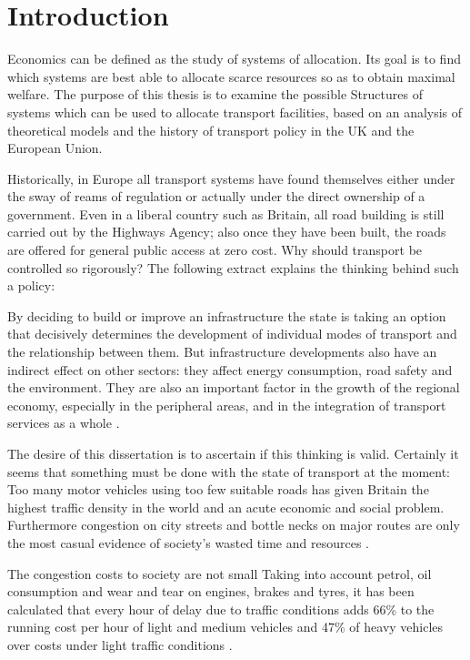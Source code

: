 \chapter{Introduction}

Economics can be defined as the study of systems of allocation. Its goal is to find which systems are best able to allocate scarce resources so as to obtain maximal welfare. The purpose of this thesis is to examine the possible Structures of systems which can be used to allocate transport facilities, based on an analysis of theoretical models and the history of transport policy in the UK and the European Union.

Historically, in Europe all transport systems have found themselves either under the sway of reams of regulation or actually under the direct ownership of a government. Even in a liberal country such as Britain, all road building is still carried out by the Highways Agency; also once they have been built, the roads are offered for general public access at zero cost. Why should transport be controlled so rigorously? The following extract explains the thinking behind such a policy:

\begin{displayquote}
By deciding to build or improve an infrastructure the state is taking an option that decisively determines the development of individual modes of transport and the relationship between them. But infrastructure developments also have an indirect effect on other sectors: they affect energy consumption, road safety and the environment. They are also an important factor in the growth of the regional economy, especially in the peripheral areas, and in the integration of transport services as a whole \cite{Stasinopoulos:1995}.
\end{displayquote}

The desire of this dissertation is to ascertain if this thinking is valid. Certainly it seems that something must be done with the state of transport at the moment: Too many motor vehicles using too few suitable roads has given Britain the highest traffic density in the world and an acute economic and social problem. Furthermore congestion on city streets and bottle necks on major routes are only the most casual evidence of society's wasted time and resources \cite{Rodgers:1959}.
 
The congestion costs to society are not small Taking into account petrol, oil consumption and wear and tear on engines, brakes and tyres, it has been calculated that every hour of delay due to traffic conditions adds 66\% to the running cost per hour of light and medium vehicles and 47\% of heavy vehicles over costs under light traffic conditions \cite{Glanville:1957}.


